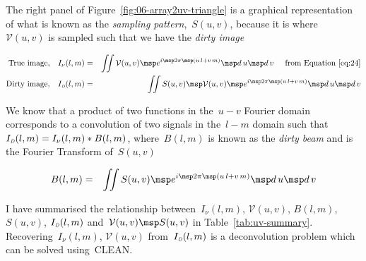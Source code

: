 The right panel of Figure~\ref{fig:06-array2uv-triangle} is a graphical representation of what is known as the \emph{sampling pattern},~$S(u, v)$, because it is where~$\mathcal{V}(u, v)$ is sampled such that we have the \emph{dirty image}

\begin{eqnarray}
  \label{eq:28}
   \mbox{True image,} \quad I_\nu (l, m) &=& \iint \mathcal{V}(u, v) \msp e^{ i \msp 2\pi \msp (u\,l + v\,m)} \msp d\,u \msp d\,v \hspace{0.5cm} \mbox{from Equation~\eqref{eq:24}} \nonumber \\
   \mbox{Dirty image,} \quad I_{\mbox{\tiny{\emph{D}}}} (l, m) &=& \iint S(u, v) \msp \mathcal{V}(u, v) \msp e^{ i \msp 2\pi \msp (u\,l + v\,m)} \msp d\,u \msp d\,v
\end{eqnarray}

We know that a product of two functions in the~$u-v$ Fourier domain corresponds to a convolution of two signals in the~$l-m$ domain such that~$I_{\mbox{\tiny{\emph{D}}}} (l, m) = I_\nu (l,m) * B(l,m)$, where~$B(l,m)$ is known as the \emph{dirty beam} and is the Fourier Transform of~$S(u, v)$

\begin{eqnarray}
  \label{eq:29}
  B(l,m) &=& \iint S(u, v) \msp e^{ i \msp 2\pi \msp (u\,l + v\,m)} \msp d\,u \msp d\,v \nonumber
\end{eqnarray}

I have summarised the relationship between~$I_\nu (l, m)$, $\mathcal{V}(u,  v)$, $B(l, m)$, $S(u, v)$, $I_{\mbox{\tiny{\emph{D}}}}(l, m)$ and~$\mathcal{V}(u,  v) \msp S(u, v)$ in Table~\ref{tab:uv-summary}. Recovering~$I_\nu (l, m)$, $\mathcal{V}(u,  v)$ from~$I_{\mbox{\tiny{\emph{D}}}}(l, m)$ is a deconvolution problem which can be solved using~CLEAN.


